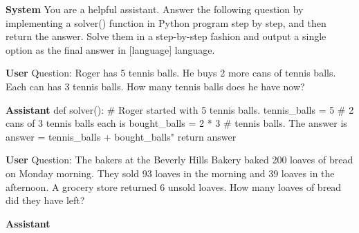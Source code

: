 \begin{figure*}[h]
    \small
    \centering
    \begin{mdframed}
    \textbf{System} \newline
    You are a helpful assistant. Answer the following question
    by implementing a solver() function in Python program
    step by step, and then return the answer.
    \newline
    Solve them in a step-by-step fashion and output a single option as the final answer in [language] language.
    \end{mdframed}
    \begin{mdframed}
    \textbf{User} \newline
    Question: Roger has 5 tennis balls. He buys 2 more cans of tennis balls. Each can has 3 tennis balls. How many tennis balls does he have now?
    \end{mdframed}
    \begin{mdframed}
    \textbf{Assistant}\newline
    def solver():\newline\hspace*{6mm}    \# Roger started with 5 tennis balls.\newline\hspace*{6mm}    tennis\_balls = 5\newline\hspace*{6mm}    \# 2 cans of 3 tennis balls each is\newline\hspace*{6mm}    bought\_balls = 2 * 3\newline\hspace*{6mm}    \# tennis balls. The answer is\newline\hspace*{6mm}    answer = tennis\_balls + bought\_balls"\newline\hspace*{6mm}    return answer
    \end{mdframed}
    \begin{mdframed}
    \textbf{User}\newline
        Question: The bakers at the Beverly Hills Bakery baked 200 loaves of bread on Monday morning. They sold 93 loaves in the morning and 39 loaves in the afternoon. A grocery store returned 6 unsold loaves. How many loaves of bread did they have left?
    \end{mdframed}
    \begin{mdframed}
        \textbf{Assistant}\newline

\end{mdframed}
\end{figure*}

